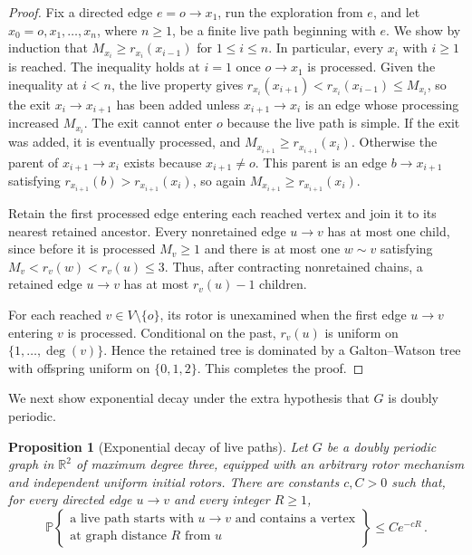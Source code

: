 \documentclass[11pt]{amsart}
\theoremstyle{plain}
\newtheorem{proposition}[theorem]{Proposition}
\theoremstyle{definition}
\newcommand{\R}{\mathbb R}
\renewcommand{\P}{\mathbb P}
\begin{document}
	\begin{proof}
		Fix a directed edge $e=o\to x_1$, run the exploration from $e$, and let
		$x_0=o,x_1,\ldots,x_n$, where $n\geq1$, be a finite live path beginning with
		$e$.
		We show by induction that
		$M_{x_i}\geq r_{x_i}(x_{i-1})$ for $1\leq i\leq n$.  In particular, every
		$x_i$ with $i\geq1$ is reached.  The inequality holds at $i=1$ once
		$o\to x_1$ is processed.  Given the
		inequality at $i<n$, the live property gives
		$r_{x_i}(x_{i+1})<r_{x_i}(x_{i-1})\leq M_{x_i}$,
		so the exit $x_i\to x_{i+1}$ has been added unless $x_{i+1}\to x_i$ is an
		edge whose processing increased $M_{x_i}$.  The exit cannot enter $o$ because
		the live path is simple.  If the exit was added, it is eventually processed, and
		$M_{x_{i+1}}\geq r_{x_{i+1}}(x_i)$.  Otherwise the parent of
		$x_{i+1}\to x_i$ exists because $x_{i+1}\ne o$.  This parent is an edge
		$b\to x_{i+1}$ satisfying
		$r_{x_{i+1}}(b)>r_{x_{i+1}}(x_i)$, so again
		$M_{x_{i+1}}\geq r_{x_{i+1}}(x_i)$.
		
		Retain the first processed edge entering each reached vertex and join it to its
		nearest retained ancestor.  Every nonretained edge $u\to v$ has at most one
		child, since before it is processed $M_v\geq1$ and there is at most one
		$w\sim v$ satisfying $M_v<r_v(w)<r_v(u)\leq3$.  Thus, after contracting
		nonretained chains, a retained edge $u\to v$ has at most $r_v(u)-1$ children.

		For each reached $v\in V\setminus\{o\}$, its rotor is unexamined when the first
		edge $u\to v$ entering $v$ is processed.  Conditional on the past, $r_v(u)$ is
		uniform on $\{1,\ldots,\deg(v)\}$.  Hence the retained tree is dominated by a
		Galton--Watson tree with offspring uniform on $\{0,1,2\}$. This completes the proof. 
	\end{proof}
	
	We next show exponential decay under the extra hypothesis that $G$ is doubly periodic.
	
	\begin{proposition}[Exponential decay of live paths]
		\label{prop:degree-three-passage}
		Let $G$ be a doubly periodic graph in $\R^2$ of maximum degree three, equipped with an
		arbitrary rotor mechanism and independent uniform initial rotors.
		There are constants $c,C>0$ such that, for every directed edge $u\to v$ and
		every integer $R\geq1$,
		\begin{equation}\label{eq:degree-three-live-path-tail}
			\P\left\{
			\begin{array}{c}
				\text{a live path starts with $u\to v$ and contains a vertex}\\
				\text{at graph distance $R$ from $u$}
			\end{array}
			\right\}
			\leq Ce^{-cR}\, .
		\end{equation}
	\end{proposition}
	
\end{document}
